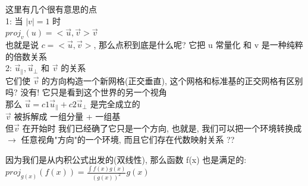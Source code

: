 \documentclass[12pt]{article}
\begin{document}
\begin{flushleft}
\begin{itemize}
              这里有几个很有意思的点  \\
              1:  当 $|v| = 1$ 时  \\
              $proj_{v}(u) = <\vec{u},\vec{v}>\vec{v}$  \\
              也就是说 $ c = <\vec{u},\vec{v}>$, 那么点积到底是什么呢? 它把 u 常量化 和 v 是一种纯粹的倍数关系 \\
              2: $\vec{u}_{\parallel}, \vec{u}_{\perp}$ 和 $\vec{v}$ 的关系 \\
              它们使 $\vec{v}$ 的方向构造一个新网格(正交垂直), 这个网格和标准基的正交网格有区别吗?
              没有! 它只是看到这个世界的另一个视角 \\
              那么 $\vec{u} = c1\vec{u}_{\parallel} + c2\vec{u}_{\perp}$ 是完全成立的 \\
              $\vec{v}$ 被拆解成 一组分量 + 一组基 \\
              但$\vec{v}$ 在开始时 我们已经确了它只是一个方向, 也就是, 我们可以把一个环境转换成 $\to$ 任意视角"方向"的一个环境, 而且它们存在代数映射关系 ??

              因为我们是从内积公式出发的(双线性), 那么函数 f(x) 也是满足的: \\
              $proj_{g(x)}(f(x)) = \frac{\int f(x)g(x)}{(g(x))^{2}}g(x)$
    \end{itemize}
\end{flushleft}
\end{document}
